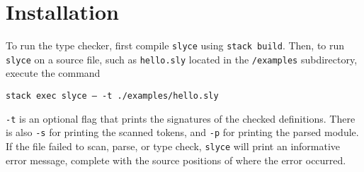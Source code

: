 \section{Installation}
 To run the type checker, first compile \texttt{slyce} using \texttt{stack build}. 
 Then, to run \texttt{slyce} on a source file, such as \texttt{hello.sly}
 located in the \texttt{/examples} subdirectory, execute the
 command\newline\centerline{\texttt{stack exec slyce -- -t ./examples/hello.sly}}\newline
\texttt{-t} is an optional flag that prints the signatures of the checked
definitions. There is also \texttt{-s} for printing the scanned tokens, and
\texttt{-p} for printing the parsed module.
 If the file failed to scan, parse, or type check, \texttt{slyce} 
will print an informative error message, complete with the source positions of
where the error occurred.
